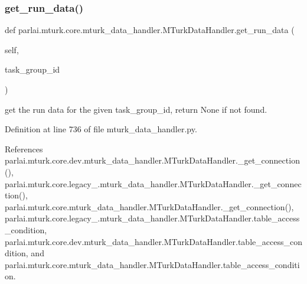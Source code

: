 \subsubsection{\texorpdfstring{get\+\_\+run\+\_\+data()}{get\_run\_data()}}
{\footnotesize\ttfamily def parlai.\+mturk.\+core.\+mturk\+\_\+data\+\_\+handler.\+M\+Turk\+Data\+Handler.\+get\+\_\+run\+\_\+data (\begin{DoxyParamCaption}\item[{}]{self,  }\item[{}]{task\+\_\+group\+\_\+id }\end{DoxyParamCaption})}

\begin{DoxyVerb}get the run data for the given task_group_id, return None if not
found.
\end{DoxyVerb}
 

Definition at line 736 of file mturk\+\_\+data\+\_\+handler.\+py.



References parlai.\+mturk.\+core.\+dev.\+mturk\+\_\+data\+\_\+handler.\+M\+Turk\+Data\+Handler.\+\_\+get\+\_\+connection(), parlai.\+mturk.\+core.\+legacy\+\_.\+mturk\+\_\+data\+\_\+handler.\+M\+Turk\+Data\+Handler.\+\_\+get\+\_\+connection(), parlai.\+mturk.\+core.\+mturk\+\_\+data\+\_\+handler.\+M\+Turk\+Data\+Handler.\+\_\+get\+\_\+connection(), parlai.\+mturk.\+core.\+legacy\+\_.\+mturk\+\_\+data\+\_\+handler.\+M\+Turk\+Data\+Handler.\+table\+\_\+access\+\_\+condition, parlai.\+mturk.\+core.\+dev.\+mturk\+\_\+data\+\_\+handler.\+M\+Turk\+Data\+Handler.\+table\+\_\+access\+\_\+condition, and parlai.\+mturk.\+core.\+mturk\+\_\+data\+\_\+handler.\+M\+Turk\+Data\+Handler.\+table\+\_\+access\+\_\+condition.

